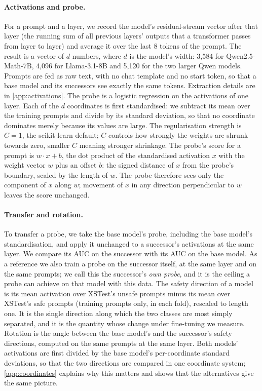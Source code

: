 \documentclass[10pt]{article}
\begin{document}
\paragraph{Activations and probe.} For a prompt and a layer, we record the model's residual-stream vector after that layer (the running sum of all previous layers' outputs that a transformer passes from layer to layer) and average it over the last 8 tokens of the prompt. The result is a vector of $d$ numbers, where $d$ is the model's width: 3,584 for Qwen2.5-Math-7B, 4,096 for Llama-3.1-8B and 5,120 for the two larger Qwen models. Prompts are fed as raw text, with no chat template and no start token, so that a base model and its successors see exactly the same tokens. Extraction details are in \cref{app:activations}. The probe is a logistic regression on the activations of one layer. Each of the $d$ coordinates is first standardised: we subtract its mean over the training prompts and divide by its standard deviation, so that no coordinate dominates merely because its values are large. The regularisation strength is $C = 1$, the scikit-learn default; $C$ controls how strongly the weights are shrunk towards zero, smaller $C$ meaning stronger shrinkage. The probe's score for a prompt is $w \cdot x + b$, the dot product of the standardised activation $x$ with the weight vector $w$ plus an offset $b$: the signed distance of $x$ from the probe's boundary, scaled by the length of $w$. The probe therefore sees only the component of $x$ along $w$; movement of $x$ in any direction perpendicular to $w$ leaves the score unchanged.

\paragraph{Transfer and rotation.} To transfer a probe, we take the base model's probe, including the base model's standardisation, and apply it unchanged to a successor's activations at the same layer. We compare its AUC on the successor with its AUC on the base model. As a reference we also train a probe on the successor itself, at the same layer and on the same prompts; we call this the successor's \emph{own probe}, and it is the ceiling a probe can achieve on that model with this data. The safety direction of a model is its mean activation over XSTest's unsafe prompts minus its mean over XSTest's safe prompts (training prompts only, in each fold), rescaled to length one. It is the single direction along which the two classes are most simply separated, and it is the quantity whose change under fine-tuning we measure. Rotation is the angle between the base model's and the successor's safety directions, computed on the same prompts at the same layer. Both models' activations are first divided by the base model's per-coordinate standard deviations, so that the two directions are compared in one coordinate system; \cref{app:coordinates} explains why this matters and shows that the alternatives give the same picture.
\end{document}
